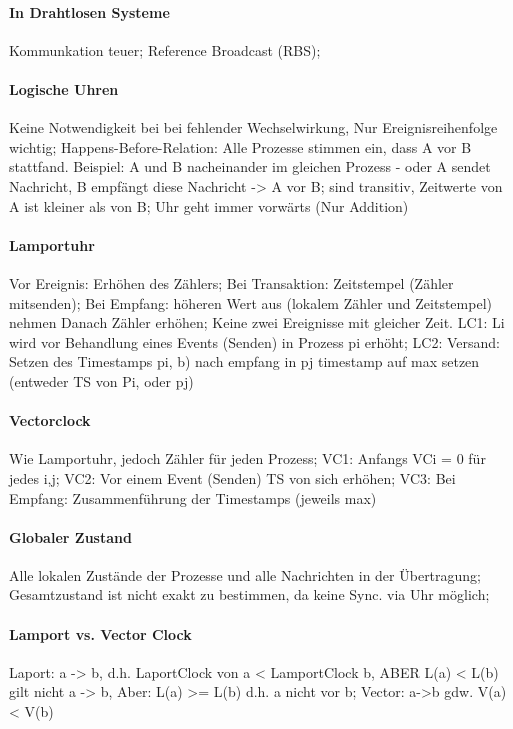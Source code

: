 \documentclass[pagesize,11pt,a4paper]{scrartcl}
\begin{document}
\paragraph*{In Drahtlosen Systeme}
	Kommunkation teuer; Reference Broadcast (RBS);

\paragraph*{Logische Uhren}
	Keine Notwendigkeit bei bei fehlender Wechselwirkung, Nur Ereignisreihenfolge wichtig;
	Happens-Before-Relation: Alle Prozesse stimmen ein, dass A vor B stattfand.
		Beispiel: A und B nacheinander im gleichen Prozess -
		oder A sendet Nachricht, B empfängt diese Nachricht -> A vor B;
	sind transitiv, Zeitwerte von A ist kleiner als von B;
	Uhr geht immer vorwärts (Nur Addition)

\paragraph*{Lamportuhr}
	Vor Ereignis: Erhöhen des Zählers;
	Bei Transaktion: Zeitstempel (Zähler mitsenden);
	Bei Empfang: höheren Wert aus (lokalem Zähler und Zeitstempel) nehmen Danach Zähler erhöhen;
	Keine zwei Ereignisse mit gleicher Zeit.
	LC1: Li wird vor Behandlung eines Events (Senden) in Prozess pi erhöht;
	LC2: Versand: Setzen des Timestamps pi, b) nach empfang in pj timestamp auf max setzen (entweder TS von Pi, oder pj)

\paragraph*{Vectorclock}
	Wie Lamportuhr, jedoch Zähler für jeden Prozess;
	VC1: Anfangs VCi = 0 für jedes i,j;
	VC2: Vor einem Event (Senden) TS von sich erhöhen;
	VC3: Bei Empfang: Zusammenführung der Timestamps (jeweils max)
\paragraph*{Globaler Zustand}
	Alle lokalen Zustände der Prozesse und alle Nachrichten in der Übertragung;
	Gesamtzustand ist nicht exakt zu bestimmen, da keine Sync. via Uhr möglich;


\paragraph*{Lamport vs. Vector Clock}
	Laport: a -> b, d.h. LaportClock von a < LamportClock b, ABER L(a) < L(b) gilt nicht a -> b, Aber: L(a) >= L(b) d.h. a nicht vor b;
	Vector: a->b gdw. V(a) < V(b)
\end{document}

